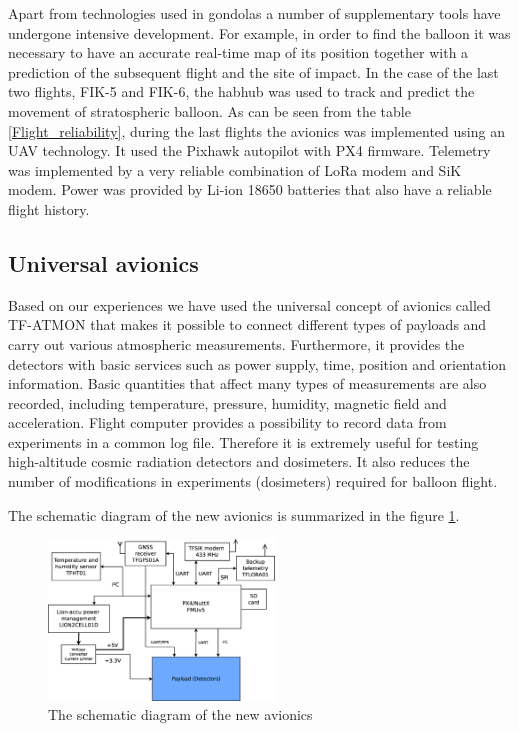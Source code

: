 \documentclass{Rpd}
\begin{document}
Apart from technologies used in gondolas a number of supplementary tools have undergone intensive development. For example, in order to find the balloon it was necessary to have an accurate real-time map of its position together with a prediction of the subsequent flight and the site of impact. In the case of the last two flights, FIK-5 and FIK-6, the habhub \cite{habhub_tracker} was used to track and predict the movement of stratospheric balloon.
As can be seen from the table \ref{Flight_reliability}, during the last flights the avionics was implemented using an UAV technology. It used the Pixhawk autopilot with PX4 firmware. Telemetry was implemented by a very reliable combination of LoRa modem and SiK modem. Power was provided by Li-ion 18650 batteries that also have a reliable flight history.



\subsection{Universal avionics}
Based on our experiences we have used the universal concept of avionics called TF-ATMON that makes it possible to connect different types of payloads and carry out various atmospheric measurements. Furthermore, it provides the detectors with basic services such as power supply, time, position and orientation information. Basic quantities that affect many types of measurements are also recorded, including temperature, pressure, humidity, magnetic field and acceleration. Flight computer provides a possibility to record data from experiments in a common log file. Therefore it is extremely useful for testing high-altitude cosmic radiation detectors and dosimeters. It also reduces the number of modifications in experiments (dosimeters) required for balloon flight.

The schematic diagram of the new avionics is summarized in the figure \ref{avionics_schematics}.


\begin{figure}%
	\centerline{\includegraphics[width=60mm]{img/avionics_block_schematics.eps}}
	\caption{The schematic diagram of the new avionics \label{avionics_schematics}}
\end{figure}
\end{document}
